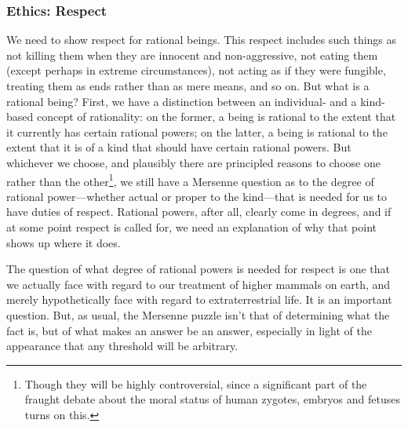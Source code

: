 \subsubsection{Ethics: Respect}
We need to show respect for rational beings. This respect includes such things as not killing them when they are
innocent and non-aggressive, not eating them (except perhaps in extreme circumstances), not acting as if they were fungible, treating them as ends rather than as
mere means, and so on. But what is a rational being? First, we have a distinction between an individual- and a 
kind-based
concept of rationality: on the former, a being is rational to the extent that it currently has certain rational powers;
on the latter, a being is rational to the extent that it is of a kind that should have certain rational powers. But whichever we choose, and
plausibly there are principled reasons to choose one rather than the other\footnote{Though they will be highly controversial, since 
a significant part of the fraught debate about the moral status of human zygotes, embryos and fetuses turns on this.}, 
we still have a Mersenne question as to the degree of rational power---whether actual or proper to the kind---that is 
needed for us to have duties of respect. Rational powers, after all, clearly come in degrees, and if at some point respect
is called for, we need an explanation of why that point shows up where it does.

The question of what degree of rational powers is needed for respect is one that we actually face with regard to our treatment
of higher mammals on earth, and merely hypothetically face with regard to extraterrestrial life. 
It is an important question. But, as usual, the Mersenne puzzle isn't that of determining what the fact is, but of what makes 
an answer be an answer, especially in light of the appearance that any threshold will be arbitrary.

